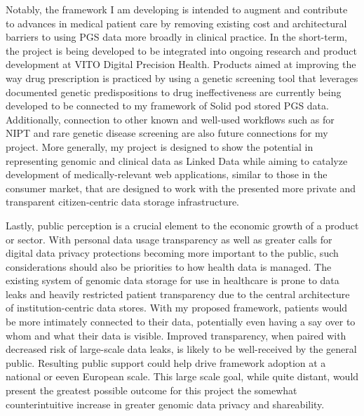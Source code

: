 \documentclass[runningheads]{llncs}
\begin{document}
Notably, the framework I am developing is intended to augment and contribute to advances in medical patient care by removing existing cost and architectural barriers to using PGS data more broadly in clinical practice. 
In the short-term, the project is being developed to be integrated into ongoing research and product development at VITO Digital Precision Health. 
Products aimed at improving the way drug prescription is practiced by using a genetic screening tool that leverages documented genetic predispositions to drug ineffectiveness are currently being developed to be connected to my framework of Solid pod stored PGS data. 
Additionally, connection to other known and well-used workflows such as for NIPT and rare genetic disease screening are also future connections for my project. 
More generally, my project is designed to show the potential in representing genomic and clinical data as Linked Data while aiming to catalyze  development of medically-relevant web applications, similar to those in the consumer market, that are designed to work with the presented more private and transparent citizen-centric data storage infrastructure.

Lastly, public perception is a crucial element to the economic growth of a product or sector. 
With personal data usage transparency as well as greater calls for digital data privacy protections becoming more important to the public, such considerations should also be priorities to how health data is managed. 
The existing system of genomic data storage for use in healthcare is prone to data leaks and heavily restricted patient transparency due to the central architecture of institution-centric data stores. 
With my proposed framework, patients would be more intimately connected to their data, potentially even having a say over to whom and what their data is visible. 
Improved transparency, when paired with decreased risk of large-scale data leaks, is likely to be well-received by the general public. 
Resulting public support could help drive framework adoption at a national or eeven European scale. 
This large scale goal, while quite distant, would present the greatest possible outcome for this project the somewhat counterintuitive increase in greater genomic data privacy and shareability. 
\end{document}
